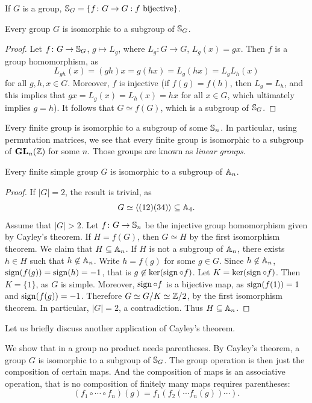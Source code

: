 If $G$ is a group, $\mathbb{S}_G=\{f\colon G\to G:f\text{ bijective}\}$.

\begin{theorem}[Cayley]
\label{thm:Cayley}
Every group $G$ is isomorphic to a subgroup of $\mathbb{S}_G$.
\end{theorem}

\begin{proof}
Let $f\colon G\to\mathbb{S}_G$, $g\mapsto L_g$, where $L_g\colon G\to G$, $L_g(x)=gx$. Then $f$ is a group homomorphism, as 
\[
L_{gh}(x)=(gh)x=g(hx)=L_g(hx)=L_gL_h(x)
\]
for all $g,h,x\in G$. Moreover, $f$ is injective (if $f(g)=f(h)$, then $L_g=L_h$, and this implies that 
$gx=L_g(x)=L_h(x)=hx$ for all $x\in G$, which ultimately implies $g=h$).
It follows that $G\simeq f(G)$, which is a subgroup of $\mathbb{S}_G$. 
\end{proof}

Every finite group is isomorphic to a subgroup of some 
$\mathbb{S}_n$. 
In particular, using permutation matrices, 
we see that every finite group is 
isomorphic to a subgroup of $\mathbf{GL}_n(\mathbb{Z})$ for some $n$.
Those groups are known as \emph{linear groups}.

\begin{optional}
\begin{proposition}
Every finite simple group $G$ is isomorphic to a subgroup of $\mathbb{A}_n$.
\end{proposition}

\begin{proof}
If $|G|=2$, the result is trivial, as 
\[
G\simeq\langle (12)(34)\rangle\subseteq\mathbb{A}_4.
\]
Assume 
that $|G|>2$.
Let $f\colon G\to\mathbb{S}_n$ be the injective group homomorphism
given by Cayley's theorem. If $H=f(G)$, then 
$G\simeq H$ by the first isomorphism theorem. 
We claim that $H\subseteq\mathbb{A}_n$. If
$H$ is not a subgroup of $\mathbb{A}_n$, there exists $h\in H$ such that  $h\not\in\mathbb{A}_n$. Write $h=f(g)$ for some 
$g\in G$. Since $h\not\in\mathbb{A}_n$,
$\operatorname{sign}(f(g))=\operatorname{sign}(h)=-1$, that is 
$g\not\in\ker(\operatorname{sign}\circ f)$.
Let $K=\ker(\operatorname{sign}\circ f)$. Then $K=\{1\}$, as $G$ is simple. Moreover, $\operatorname{sign}\circ f$ is a bijective map, as
$\operatorname{sign}(f(1))=1$ and $\operatorname{sign}(f(g))=-1$. Therefore 
$G\simeq G/K\simeq\mathbb{Z}/2$, by the first isomorphism theorem.  
In particular, $|G|=2$, a contradiction. Thus $H\subseteq\mathbb{A}_n$.
\end{proof}
\end{optional}


Let us briefly discuss another application of Cayley’s theorem. 

\begin{optional}
We show that in a group no product needs parentheses. By Cayley’s theorem, a group  $G$  is isomorphic to a subgroup of $\mathbb{S}_G$. The group operation is then just the composition of certain maps. And the composition of maps is an associative operation, that is no composition of finitely many maps requires parentheses: 
\[
(f_1\circ\cdots\circ f_n)(g)=f_1(f_2(\cdots f_n(g))\cdots).
\]
\end{optional}
